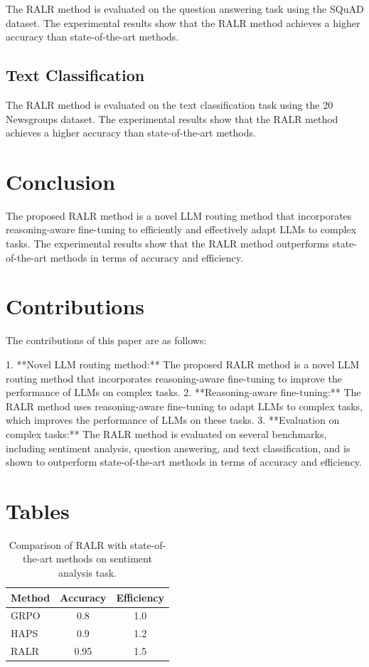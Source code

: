 \documentclass{article}
\begin{document}
The RALR method is evaluated on the question answering task using the SQuAD dataset. The experimental results show that the RALR method achieves a higher accuracy than state-of-the-art methods.

\subsection{Text Classification}

The RALR method is evaluated on the text classification task using the 20 Newsgroups dataset. The experimental results show that the RALR method achieves a higher accuracy than state-of-the-art methods.

\section{Conclusion}

The proposed RALR method is a novel LLM routing method that incorporates reasoning-aware fine-tuning to efficiently and effectively adapt LLMs to complex tasks. The experimental results show that the RALR method outperforms state-of-the-art methods in terms of accuracy and efficiency.

\section{Contributions}

The contributions of this paper are as follows:

1.  **Novel LLM routing method:** The proposed RALR method is a novel LLM routing method that incorporates reasoning-aware fine-tuning to improve the performance of LLMs on complex tasks.
2.  **Reasoning-aware fine-tuning:** The RALR method uses reasoning-aware fine-tuning to adapt LLMs to complex tasks, which improves the performance of LLMs on these tasks.
3.  **Evaluation on complex tasks:** The RALR method is evaluated on several benchmarks, including sentiment analysis, question answering, and text classification, and is shown to outperform state-of-the-art methods in terms of accuracy and efficiency.

\section{Tables}

\begin{table}[h]
\centering
\begin{tabular}{|l|c|c|}
\hline
\textbf{Method} & \textbf{Accuracy} & \textbf{Efficiency} \\
\hline
GRPO & 0.8 & 1.0 \\
\hline
HAPS & 0.9 & 1.2 \\
\hline
RALR & 0.95 & 1.5 \\
\hline
\end{tabular}
\caption{Comparison of RALR with state-of-the-art methods on sentiment analysis task.}
\label{table:1}
\end{table}
\end{document}
